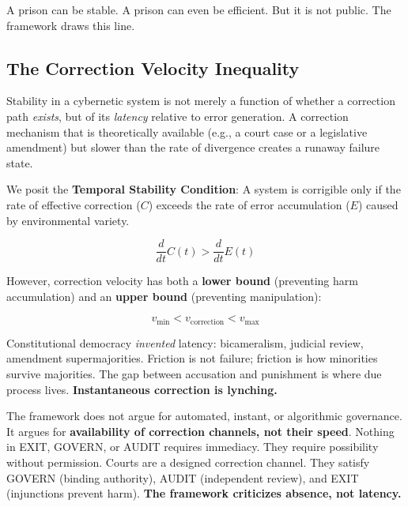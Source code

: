 A prison can be stable. A prison can even be efficient. But it is not public. The framework draws this line.

\subsection{The Correction Velocity Inequality}
\label{subsec:velocity}

Stability in a cybernetic system is not merely a function of whether a correction path \textit{exists}, but of its \textit{latency} relative to error generation. A correction mechanism that is theoretically available (e.g., a court case or a legislative amendment) but slower than the rate of divergence creates a runaway failure state.

We posit the \textbf{Temporal Stability Condition}: A system is corrigible only if the rate of effective correction ($C$) exceeds the rate of error accumulation ($E$) caused by environmental variety.

\begin{equation}
\frac{d}{dt} C(t) > \frac{d}{dt} E(t)
\label{eq:velocity-lower}
\end{equation}

However, correction velocity has both a \textbf{lower bound} (preventing harm accumulation) and an \textbf{upper bound} (preventing manipulation):

\begin{equation}
v_{\min} < v_{\text{correction}} < v_{\max}
\label{eq:velocity-bounds}
\end{equation}

\begin{clarification}[title=Velocity Bounds]
Constitutional democracy \textit{invented} latency: bicameralism, judicial review, amendment supermajorities. Friction is not failure; friction is how minorities survive majorities. The gap between accusation and punishment is where due process lives. \textbf{Instantaneous correction is lynching.}

The framework does not argue for automated, instant, or algorithmic governance. It argues for \textbf{availability of correction channels, not their speed}. Nothing in EXIT, GOVERN, or AUDIT requires immediacy. They require possibility without permission. Courts are a designed correction channel. They satisfy GOVERN (binding authority), AUDIT (independent review), and EXIT (injunctions prevent harm). \textbf{The framework criticizes absence, not latency.}
\end{clarification}

